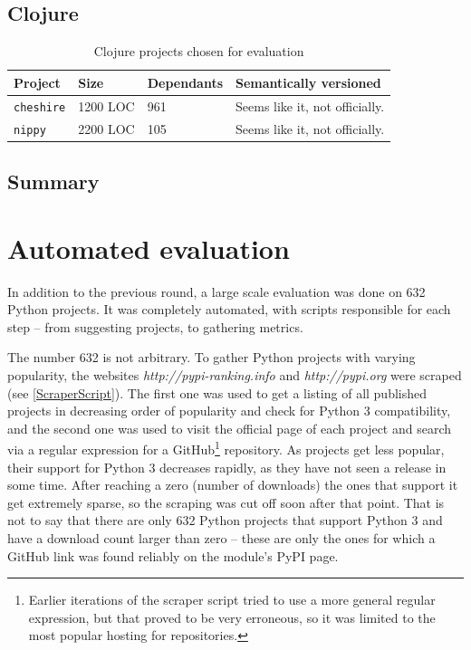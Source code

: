 \documentclass{l4proj}
\newcommand\genericstyle{\lstset{basicstyle=\ttm}}
\newcommand\codeinline[1]{{\genericstyle\lstinline!#1!}}
\begin{document}
\subsection{Clojure}

\begin{table}[H]
\label{ClojureProjectsForEvaluation}
\centering
\begin{tabular}{|l|l|l|p{10cm}|}
\hline
\textbf{Project} & \textbf{Size} & \textbf{Dependants} & \textbf{Semantically versioned} \\
\hline
\codeinline{cheshire} & 1200 LOC & 961 & Seems like it, not
officially. \\
\codeinline{nippy} & 2200 LOC & 105 & Seems like it, not officially. \\
\hline
\end{tabular}
\caption{Clojure projects chosen for evaluation}
\end{table}

\subsection{Summary}


\section{Automated evaluation}

In addition to the previous round, a large scale evaluation was done
on 632 Python projects. It was completely automated, with scripts
responsible for each step -- from suggesting projects, to gathering
metrics.

The number 632 is not arbitrary. To gather Python projects with
varying popularity, the websites \textit{http://pypi-ranking.info} and
\textit{http://pypi.org} were scraped (see \ref{ScraperScript}). The
first one was used to get a listing of all published projects in
decreasing order of popularity and check for Python 3 compatibility,
and the second one was used to visit the official page of each project
and search via a regular expression for a GitHub\footnote{Earlier
iterations of the scraper script tried to use a more general regular
expression, but that proved to be very erroneous, so it was limited to
the most popular hosting for repositories.} repository. As projects
get less popular, their support for Python 3 decreases rapidly, as
they have not seen a release in some time. After reaching a zero
(number of downloads) the ones that support it get extremely sparse,
so the scraping was cut off soon after that point. That is not to say
that there are only 632 Python projects that support Python 3 and have
a download count larger than zero -- these are only the ones for which
a GitHub link was found reliably on the module's PyPI page.
\end{document}
